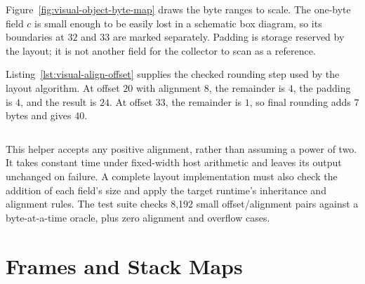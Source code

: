 Figure~\ref{fig:visual-object-byte-map} draws the byte ranges to scale.
The one-byte field $c$ is small enough to be easily lost in a schematic box diagram, so its boundaries at $32$ and $33$ are marked separately.
Padding is storage reserved by the layout; it is not another field for the collector to scan as a reference.




Listing~\ref{lst:visual-align-offset} supplies the checked rounding step used by the layout algorithm.
At offset $20$ with alignment $8$, the remainder is $4$, the padding is $4$, and the result is $24$.
At offset $33$, the remainder is $1$, so final rounding adds $7$ bytes and gives $40$.

\begin{listing}[htbp]
  \inputminted{c}{example-code/visual-labs/layout.c}
  \caption{Alignment rounding rejects zero alignment and checks host overflow before adding padding.}
  \label{lst:visual-align-offset}
\end{listing}

This helper accepts any positive alignment, rather than assuming a power of two.
It takes constant time under fixed-width host arithmetic and leaves its output unchanged on failure.
A complete layout implementation must also check the addition of each field's size and apply the target runtime's inheritance and alignment rules.
The test suite checks 8,192 small offset/alignment pairs against a byte-at-a-time oracle, plus zero alignment and overflow cases.

\section{Frames and Stack Maps}\label{sec:ch32-frames}

